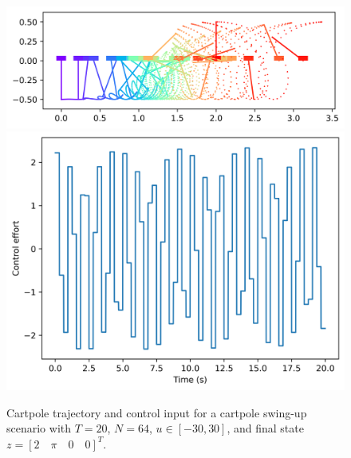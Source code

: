 \documentclass{exam}
\begin{document}
\begin{multicols}{2}
\begin{figure}[H]
    \centering
    \includegraphics[width=1.0\linewidth]{default_config_T=20_N=64_z0=0.0_0.0_0.0_0.0_zf=2.0_3.141592653589793_0.0_0.0__cartpole_swingy.png}
    \includegraphics[width=1.0\linewidth]{default_config_T=20_N=64_z0=0.0_0.0_0.0_0.0_zf=2.0_3.141592653589793_0.0_0.0__control_inputty.png}
    \caption{Cartpole trajectory and control input for a cartpole swing-up scenario with $T = 20$, $N = 64$, $u \in [-30, 30]$, and final state $z = [2 \quad \pi \quad 0 \quad 0]^T$.}
    \label{fig:loooong-time-trajectory}
\end{figure}

\end{multicols}

\nocite{*}
\end{document}
